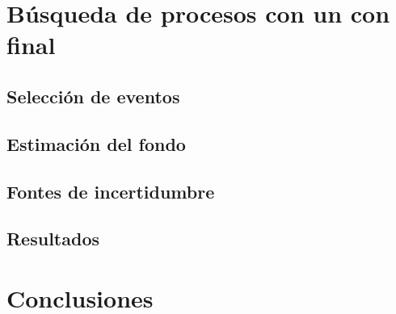 \section{Búsqueda de procesos \tH  con un con final \dileptau}
\subsection{Selección de eventos}
\subsection{Estimación del fondo}
\subsection{Fontes de incertidumbre}
\subsection{Resultados}
\section{Conclusiones}
